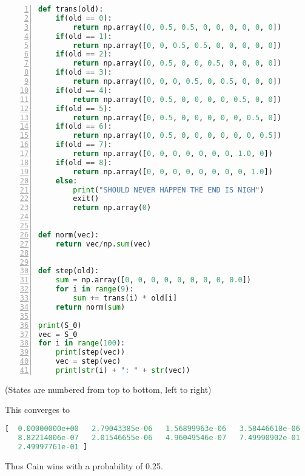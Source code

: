 \documentclass[fleqn,12pt]{scrartcl}
\begin{document}
\begin{enumerate}
\begin{lstlisting}[language=Python,basicstyle=\scriptsize,numbers=left]
def trans(old):
    if(old == 0):
        return np.array([0, 0.5, 0.5, 0, 0, 0, 0, 0, 0])
    if(old == 1):
        return np.array([0, 0, 0.5, 0.5, 0, 0, 0, 0, 0])
    if(old == 2):
        return np.array([0, 0.5, 0, 0, 0.5, 0, 0, 0, 0])
    if(old == 3):
        return np.array([0, 0, 0, 0.5, 0, 0.5, 0, 0, 0])
    if(old == 4):
        return np.array([0, 0.5, 0, 0, 0, 0, 0.5, 0, 0])
    if(old == 5):
        return np.array([0, 0.5, 0, 0, 0, 0, 0, 0.5, 0])
    if(old == 6):
        return np.array([0, 0.5, 0, 0, 0, 0, 0, 0, 0.5])
    if(old == 7):
        return np.array([0, 0, 0, 0, 0, 0, 0, 1.0, 0])
    if(old == 8):
        return np.array([0, 0, 0, 0, 0, 0, 0, 0, 1.0])
    else:
        print("SHOULD NEVER HAPPEN THE END IS NIGH")
        exit()
        return np.array(0)


def norm(vec):
    return vec/np.sum(vec)


def step(old):
    sum = np.array([0, 0, 0, 0, 0, 0, 0, 0, 0.0])
    for i in range(9):
        sum += trans(i) * old[i]
    return norm(sum)

print(S_0)
vec = S_0
for i in range(100):
    print(step(vec))
    vec = step(vec)
    print(str(i) + ": " + str(vec))
\end{lstlisting}

(States are numbered from top to bottom, left to right)

This converges to 

\begin{lstlisting}[language=Python,basicstyle=\scriptsize]
[  0.00000000e+00   2.79043385e-06   1.56899963e-06   3.58446618e-06
   8.82214006e-07   2.01546655e-06   4.96049546e-07   7.49990902e-01
   2.49997761e-01 ]
\end{lstlisting}

Thus Cain wins with a probability of 0.25.
\end{enumerate}
\end{document}
